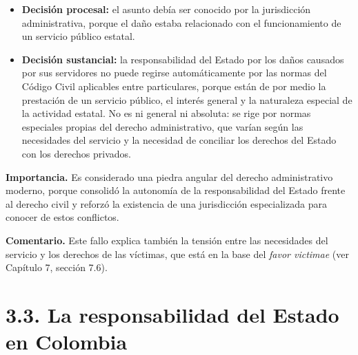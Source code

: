 \begin{itemize}
\item \textbf{Decisión procesal:} el asunto debía ser conocido por la jurisdicción administrativa, porque el daño estaba relacionado con el funcionamiento de un servicio público estatal.
\item \textbf{Decisión sustancial:} la responsabilidad del Estado por los daños causados por sus servidores no puede regirse automáticamente por las normas del Código Civil aplicables entre particulares, porque están de por medio la prestación de un servicio público, el interés general y la naturaleza especial de la actividad estatal. No es ni general ni absoluta: se rige por normas especiales propias del derecho administrativo, que varían según las necesidades del servicio y la necesidad de conciliar los derechos del Estado con los derechos privados.
\end{itemize}
\textbf{Importancia.} Es considerado una piedra angular del derecho administrativo moderno, porque consolidó la autonomía de la responsabilidad del Estado frente al derecho civil y reforzó la existencia de una jurisdicción especializada para conocer de estos conflictos.

\begin{comentario}
\textcolor[HTML]{8A6D3B}{\textbf{Comentario. }}Este fallo explica también la tensión entre las necesidades del servicio y los derechos de las víctimas, que está en la base del \textit{favor victimae} (ver Capítulo 7, sección 7.6).
\end{comentario}
\section{3.3. La responsabilidad del Estado en Colombia}
